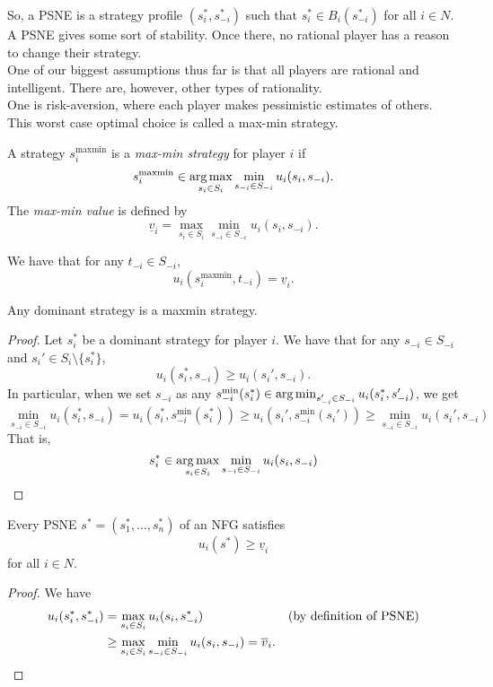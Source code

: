 	So, a PSNE is a strategy profile $(s_i^*,s_{-i}^*)$ such that $s_i^* \in B_i(s_{-i}^*)$ for all $i \in N$.\\
	A PSNE gives some sort of stability. Once there, no rational player has a reason to change their strategy.\\

	One of our biggest assumptions thus far is that all players are rational and intelligent. There are, however, other types of rationality.\\
	One is risk-aversion, where each player makes pessimistic estimates of others. This worst case optimal choice is called a max-min strategy.

	\begin{fdef}
		A strategy $s_i^\text{maxmin}$ is a \emph{max-min strategy} for player $i$ if
		\[ s_i^{\text{maxmin}} \in \operatorname*{arg\,max}_{s_i \in S_i} \min_{s_{-i} \in S_{-i}} u_i(s_i,s_{-i}). \]
		The \emph{max-min value} is defined by
		\[ \underline{v}_{i} = \max_{s_i \in S_i} \min_{s_{-i} \in S_{-i}} u_i(s_i,s_{-i}). \]
	\end{fdef}

	We have that for any $t_{-i} \in S_{-i}$,
	\[ u_i(s_i^\text{maxmin}, t_{-i}) = \underline{v}_i. \]

	\begin{ftheo}
		Any dominant strategy is a maxmin strategy.
	\end{ftheo}
	\begin{proof}
		Let $s_i^*$ be a dominant strategy for player $i$. We have that for any $s_{-i} \in S_{-i}$ and $s_i' \in S_i \setminus \{s_i^*\}$,
		\[ u_i(s_i^*, s_{-i}) \ge u_i(s_i', s_{-i}). \]
		In particular, when we set $s_{-i}$ as any $s_{-i}^\text{min}(s_i^*) \in \operatorname*{arg\,min}_{s_{-i}' \in S_{-i}} u_i(s_i^*,s_{-i}')$, we get
		\[ \min_{s_{-i} \in S_{-i}} u_i(s_i^*, s_{-i}) = u_i(s_i^*, s_{-i}^\text{min}(s_i^*)) \ge u_i(s_i', s_{-i}^\text{min}(s_i')) \ge \min_{s_{-i} \in S_{-i}} u_i(s_i', s_{-i}) \]
		That is,
		\[ s_i^* \in \operatorname*{arg\,max}_{s_i \in S_i} \min_{s_{-i} \in S_{-i}} u_i(s_i,s_{-i}) \qedhere \]
	\end{proof}

	\begin{ftheo}
		Every PSNE $s^* = (s_1^*,\ldots,s_n^*)$ of an NFG satisfies
		\[ u_i(s^*) \ge \underline{v}_i \]
		for all $i \in N$.
	\end{ftheo}
	\begin{proof}
		We have
		\begin{align*}
			u_i(s_i^*, s_{-i}^*) &= \max_{s_i \in S_i} u_i(s_i, s_{-i}^*) & \text{(by definition of PSNE)} \\
				&\ge \max_{s_i \in S_i} \min_{s_{-i} \in S_{-i}} u_i(s_i, s_{-i}) = \overline{v}_i. \qedhere
		\end{align*}
	\end{proof}

